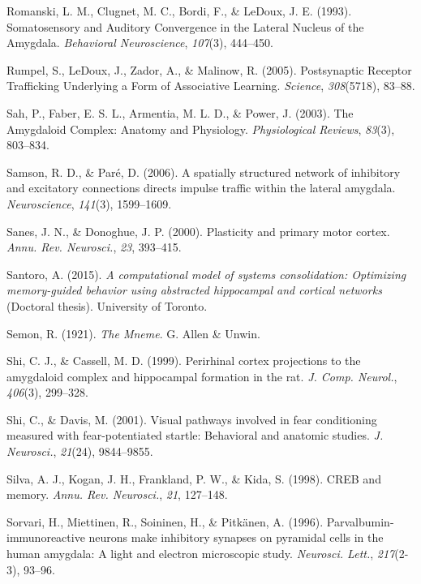 \documentclass[12pt,a4paperpaper,]{report}
\begin{document}
\hypertarget{ref-romanskiux5fsomatosensoryux5f1993}{}
Romanski, L. M., Clugnet, M. C., Bordi, F., \& LeDoux, J. E. (1993).
Somatosensory and Auditory Convergence in the Lateral Nucleus of the
Amygdala. \emph{Behavioral Neuroscience}, \emph{107}(3), 444--450.

\hypertarget{ref-rumpelux5fpostsynapticux5f2005}{}
Rumpel, S., LeDoux, J., Zador, A., \& Malinow, R. (2005). Postsynaptic
Receptor Trafficking Underlying a Form of Associative Learning.
\emph{Science}, \emph{308}(5718), 83--88.

\hypertarget{ref-sahux5famygdaloidux5f2003}{}
Sah, P., Faber, E. S. L., Armentia, M. L. D., \& Power, J. (2003). The
Amygdaloid Complex: Anatomy and Physiology. \emph{Physiological
Reviews}, \emph{83}(3), 803--834.

\hypertarget{ref-samsonux5fspatiallyux5f2006}{}
Samson, R. D., \& Paré, D. (2006). A spatially structured network of
inhibitory and excitatory connections directs impulse traffic within the
lateral amygdala. \emph{Neuroscience}, \emph{141}(3), 1599--1609.

\hypertarget{ref-sanesux5fplasticityux5f2000}{}
Sanes, J. N., \& Donoghue, J. P. (2000). Plasticity and primary motor
cortex. \emph{Annu. Rev. Neurosci.}, \emph{23}, 393--415.

\hypertarget{ref-santoroux5fcomputationalux5f2015}{}
Santoro, A. (2015). \emph{A computational model of systems
consolidation: Optimizing memory-guided behavior using abstracted
hippocampal and cortical networks} (Doctoral thesis). University of
Toronto.

\hypertarget{ref-semonux5fmnemeux5f1921}{}
Semon, R. (1921). \emph{The Mneme}. G. Allen \& Unwin.

\hypertarget{ref-shiux5fperirhinalux5f1999}{}
Shi, C. J., \& Cassell, M. D. (1999). Perirhinal cortex projections to
the amygdaloid complex and hippocampal formation in the rat. \emph{J.
Comp. Neurol.}, \emph{406}(3), 299--328.

\hypertarget{ref-shiux5fvisualux5f2001}{}
Shi, C., \& Davis, M. (2001). Visual pathways involved in fear
conditioning measured with fear-potentiated startle: Behavioral and
anatomic studies. \emph{J. Neurosci.}, \emph{21}(24), 9844--9855.

\hypertarget{ref-silvaux5fcrebux5f1998}{}
Silva, A. J., Kogan, J. H., Frankland, P. W., \& Kida, S. (1998). CREB
and memory. \emph{Annu. Rev. Neurosci.}, \emph{21}, 127--148.

\hypertarget{ref-sorvariux5fparvalbumin-immunoreactiveux5f1996}{}
Sorvari, H., Miettinen, R., Soininen, H., \& Pitkänen, A. (1996).
Parvalbumin-immunoreactive neurons make inhibitory synapses on pyramidal
cells in the human amygdala: A light and electron microscopic study.
\emph{Neurosci. Lett.}, \emph{217}(2-3), 93--96.
\end{document}
